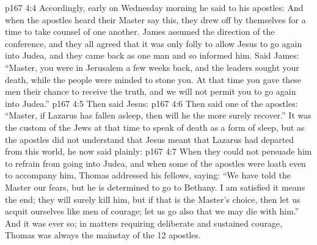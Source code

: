 \vs p167 4:4 \pc Accordingly, early on Wednesday morning he said to his apostles:  And when the apostles heard their Master say this, they drew off by themselves for a time to take counsel of one another. James assumed the direction of the conference, and they all agreed that it was only folly to allow Jesus to go again into Judea, and they came back as one man and so informed him. Said James: “Master, you were in Jerusalem a few weeks back, and the leaders sought your death, while the people were minded to stone you. At that time you gave these men their chance to receive the truth, and we will not permit you to go again into Judea.”
\vs p167 4:5 Then said Jesus: 
\vs p167 4:6 Then said one of the apostles: “Master, if Lazarus has fallen asleep, then will he the more surely recover.” It was the custom of the Jews at that time to speak of death as a form of sleep, but as the apostles did not understand that Jesus meant that Lazarus had departed from this world, he now said plainly: 
\vs p167 4:7 When they could not persuade him to refrain from going into Judea, and when some of the apostles were loath even to accompany him, Thomas addressed his fellows, saying: “We have told the Master our fears, but he is determined to go to Bethany. I am satisfied it means the end; they will surely kill him, but if that is the Master’s choice, then let us acquit ourselves like men of courage; let us go also that we may die with him.” And it was ever so; in matters requiring deliberate and sustained courage, Thomas was always the mainstay of the 12 apostles.
